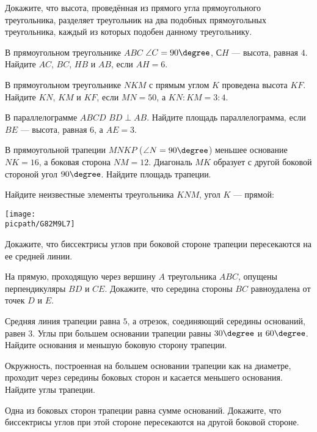 \begin{class}[number=7]
	\begin{listofex}
		\item Докажите, что высота, проведённая из прямого угла прямоугольного треугольника, разделяет треугольник на два подобных прямоугольных треугольника, каждый из которых подобен данному треугольнику.
		\item В прямоугольном треугольнике \( ABC \) \( \angle C=90\degree \), \( СH \) --- высота, равная \( 4 \). Найдите \( AC \), \( BC \), \( HB \) и \( AB \), если \( AH=6 \).
		\item В прямоугольном треугольнике \( NKM \) с прямым углом \( K \) проведена высота \( KF \). Найдите \( KN \), \( KM \) и \( KF \), если \( MN=50 \), а \( KN:KM=3:4 \).
		\item В параллелограмме \( ABCD \) \( BD\perp AB \). Найдите площадь параллелограмма, если \( BE \) --- высота, равная \( 6 \), а \( AE=3 \).
		\item В прямоугольной трапеции \( MNKP \) (\( \angle N=90\degree \)) меньшее основание \( NK=16 \), а боковая сторона \( NM=12 \). Диагональ \( MK \) образует с другой боковой стороной угол \( 90\degree \). Найдите площадь трапеции.
		\item Найдите неизвестные элементы треугольника \( KNM \), угол \( K \) --- прямой:
		\begin{center}
			\texttt{[image: \\picpath/G82M9L7]}
		\end{center}
	\end{listofex}
\end{class}

\begin{class}[number=8]
	\begin{listofex}
		\item Докажите, что биссектрисы углов при боковой стороне трапеции пересекаются на ее средней линии.
		\item На прямую, проходящую через вершину \( A \) треугольника \( ABC \), опущены перпендикуляры \( BD \) и \( CE \). Докажите, что середина стороны \( BC \) равноудалена от точек \( D \) и \( E \).
		\item Средняя линия трапеции равна \( 5 \), а отрезок, соединяющий середины оснований, равен \( 3 \). Углы при большем основании трапеции равны \( 30\degree \) и \( 60\degree \). Найдите основания и меньшую боковую сторону трапеции.
		\item Окружность, построенная на большем основании трапеции как на диаметре, проходит через середины боковых сторон и касается меньшего основания. Найдите углы трапеции.
		\item Одна из боковых сторон трапеции равна сумме оснований. Докажите, что биссектрисы углов при этой стороне пересекаются на другой боковой стороне.
	\end{listofex}
\end{class}
